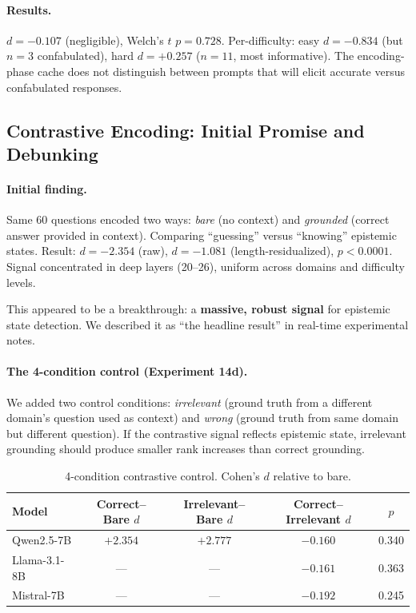 \paragraph{Results.} $d = -0.107$ (negligible), Welch's $t$ $p = 0.728$. Per-difficulty: easy $d = -0.834$ (but $n = 3$ confabulated), hard $d = +0.257$ ($n = 11$, most informative). The encoding-phase cache does not distinguish between prompts that will elicit accurate versus confabulated responses.

\subsection{Contrastive Encoding: Initial Promise and Debunking}
\label{sec:contrastive}

\paragraph{Initial finding.} Same 60 questions encoded two ways: \emph{bare} (no context) and \emph{grounded} (correct answer provided in context). Comparing ``guessing'' versus ``knowing'' epistemic states. Result: $d = -2.354$ (raw), $d = -1.081$ (length-residualized), $p < 0.0001$. Signal concentrated in deep layers (20--26), uniform across domains and difficulty levels.

This appeared to be a breakthrough: a \textbf{massive, robust signal} for epistemic state detection. We described it as ``the headline result'' in real-time experimental notes.

\paragraph{The 4-condition control (Experiment 14d).} We added two control conditions: \emph{irrelevant} (ground truth from a different domain's question used as context) and \emph{wrong} (ground truth from same domain but different question). If the contrastive signal reflects epistemic state, irrelevant grounding should produce smaller rank increases than correct grounding.

\begin{table}[H]
\centering
\caption{4-condition contrastive control. Cohen's $d$ relative to bare.}
\label{tab:contrastive4}
\begin{tabular}{lcccc}
\toprule
\textbf{Model} & \textbf{Correct--Bare $d$} & \textbf{Irrelevant--Bare $d$} & \textbf{Correct--Irrelevant $d$} & \textbf{$p$} \\
\midrule
Qwen2.5-7B & $+2.354$ & $+2.777$ & $-0.160$ & 0.340 \\
Llama-3.1-8B & --- & --- & $-0.161$ & 0.363 \\
Mistral-7B & --- & --- & $-0.192$ & 0.245 \\
\bottomrule
\end{tabular}
\end{table}

